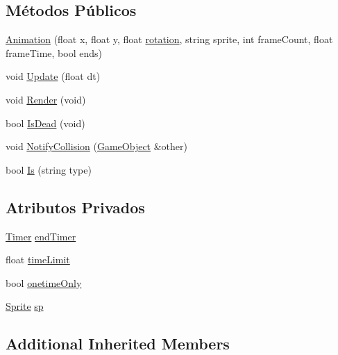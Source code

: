 \subsection*{Métodos Públicos}
\begin{DoxyCompactItemize}
\item 
\hyperlink{classAnimation_a48d3ca5ecd4b4ca7f2f6fe10cf1f91d4}{Animation} (float x, float y, float \hyperlink{classGameObject_ac55f6ebdf4cfbab508680ad7290fb26c}{rotation}, string sprite, int frame\+Count, float frame\+Time, bool ends)
\item 
void \hyperlink{classAnimation_a1871db60d1fb351aeb77ada38dd4dd9c}{Update} (float dt)
\item 
void \hyperlink{classAnimation_a49749e3890cec3896e6f726323544c26}{Render} (void)
\item 
bool \hyperlink{classAnimation_ad1eaa9ff240cbcc114270ea174523702}{Is\+Dead} (void)
\item 
void \hyperlink{classAnimation_a611b21418311eb697ec4af1aaff92657}{Notify\+Collision} (\hyperlink{classGameObject}{Game\+Object} \&other)
\item 
bool \hyperlink{classAnimation_a166f36012f3092275648a74272e8ff0f}{Is} (string type)
\end{DoxyCompactItemize}
\subsection*{Atributos Privados}
\begin{DoxyCompactItemize}
\item 
\hyperlink{classTimer}{Timer} \hyperlink{classAnimation_ad4e2674025e4f91143e574c09e213e38}{end\+Timer}
\item 
float \hyperlink{classAnimation_ab8b4a075f8bf097b7af6e732949235c6}{time\+Limit}
\item 
bool \hyperlink{classAnimation_aa8be050af14ac86c2cce45908bae750d}{onetime\+Only}
\item 
\hyperlink{classSprite}{Sprite} \hyperlink{classAnimation_abf968c115c1d8c88da797215d58ad516}{sp}
\end{DoxyCompactItemize}
\subsection*{Additional Inherited Members}


